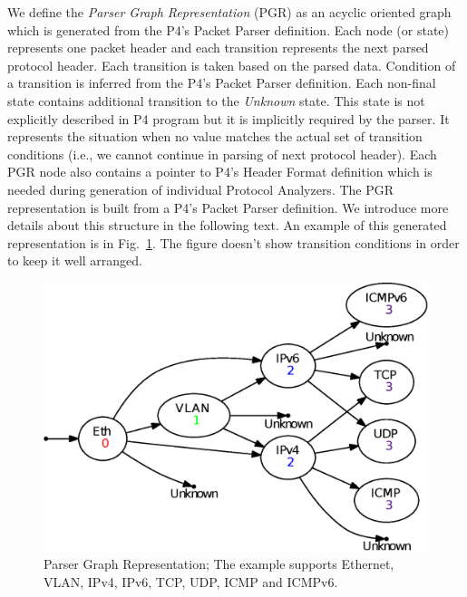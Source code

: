 We define the \textit{Parser Graph Representation} (PGR) as an acyclic oriented graph which is generated from the P4's Packet Parser definition. 
Each node (or state) represents one packet header and each transition represents the next parsed protocol header. 
Each transition is taken based on the parsed data. Condition of a transition is inferred from the P4's Packet Parser definition.
Each non-final state contains additional transition to the \textit{Unknown} state. 
This state is not explicitly described in P4 program but it is implicitly required by the parser. 
It represents the situation when no value matches the actual set of transition conditions 
(i.e., we cannot continue in parsing of next protocol header).
Each PGR node also contains a pointer to P4's Header Format definition which is needed during generation of individual Protocol Analyzers.
The PGR representation is built from a P4's Packet Parser definition.
We introduce more details about this structure in the following text. 
An example of this generated representation is in Fig.~\ref{fig:parserGraph}. 
The figure doesn't show transition conditions in order to keep it well arranged.

\begin{figure}[ht]
    \centering
    \includegraphics[scale=0.55]{chapters/pic/ParserGraph}
    \caption{Parser Graph Representation; The example supports Ethernet, VLAN, IPv4, IPv6, TCP, UDP, ICMP and ICMPv6.}
    \label{fig:parserGraph}
\end{figure}

